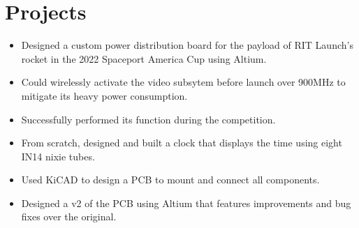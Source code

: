 \documentclass[]{deedy-resume-openfont}
\begin{document}
\begin{minipage}[t]{0.66\textwidth}




\section{Projects}

\begin{itemize}
    \setlength\itemsep{0pt}
    \item Designed a custom power distribution board for the payload of RIT Launch's rocket in the 2022 Spaceport America Cup using Altium.
    \item Could wirelessly activate the video subsytem before launch over 900MHz to mitigate its heavy power consumption. 
    \item Successfully performed its function during the competition.    
\end{itemize}

\sectionsep

\begin{itemize}
    \setlength\itemsep{0pt}
    \item From scratch, designed and built a clock that displays the time using eight IN14 nixie tubes.
    \item Used KiCAD to design a PCB to mount and connect all components.
    \item Designed a v2 of the PCB using Altium that features improvements and bug fixes over the original.
\end{itemize}


\end{minipage}
\end{document}
